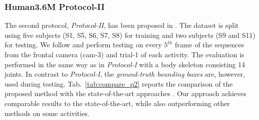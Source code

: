 \documentclass[10pt,journal,compsoc]{IEEEtran}
\begin{document}
\subsubsection{Human3.6M Protocol-II} 
The second protocol, \emph{Protocol-II}, has been proposed in \cite{bogo2016keep}. The dataset is split using five subjects (S1, S5, S6, S7, S8)
for training and two subjects (S9 and S11) for testing. We follow \cite{lassner2017unite} and perform testing
on every $5^{th}$ frame of the sequences from the frontal camera (cam-3) and trial-1 of each activity. 
The evaluation is performed in the same way as in \emph{Protocol-I} with a body skeleton consisting 14 joints. 
In contrast to \emph{Protocol-I}, the \emph{ground-truth bounding boxes} are, however, used during testing. 
Tab.~\ref{tab:compare_p2} reports the comparison of the proposed method with the state-of-the-art approaches 
\cite{Akhter:CVPR:2015, Ramakrishna_2012, zhou2015sparse, bogo2016keep, lassner2017unite, tome2017lifting, Moreno_arxiv2016}.
Our approach achieves comparable results to the state-of-the-art, while also outperforming other methods on some 
activities.    \\
\end{document}
